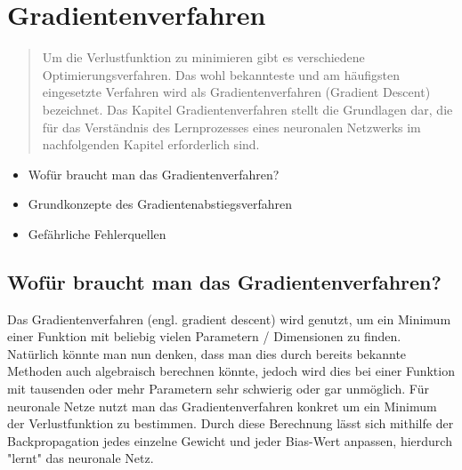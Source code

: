 \newpage
\thispagestyle{empty}
\section{Gradientenverfahren}\label{sec:gradientenverfahren}   
\begin{tcolorbox}[title={Inhalte des \textit{Gradientenverfahren}}]
  \begin{quotation}\noindent
    Um die Verlustfunktion zu minimieren gibt es verschiedene Optimierungsverfahren. Das wohl bekannteste und am häufigsten eingesetzte Verfahren wird als Gradientenverfahren (Gradient Descent) bezeichnet.
    Das Kapitel Gradientenverfahren stellt die Grundlagen dar, die für das Verständnis des Lernprozesses eines neuronalen Netzwerks im nachfolgenden Kapitel erforderlich sind.
  \end{quotation}
  \begin{itemize}
    \item Wofür braucht man das Gradientenverfahren?
    \item Grundkonzepte des Gradientenabstiegsverfahren
    \item Gefährliche Fehlerquellen

  \end{itemize}
\end{tcolorbox}


\subsection{Wofür braucht man das Gradientenverfahren?}\label{subsec:gradientenverfahren:wofuer}
Das Gradientenverfahren (engl. gradient descent) wird genutzt, um ein Minimum einer Funktion mit beliebig vielen Parametern / Dimensionen zu finden.
Natürlich könnte man nun denken, dass man dies durch bereits bekannte Methoden auch algebraisch berechnen könnte, jedoch wird dies 
bei einer Funktion mit tausenden oder mehr Parametern sehr schwierig oder gar unmöglich.
Für neuronale Netze nutzt man das Gradientenverfahren konkret um ein Minimum der Verlustfunktion zu bestimmen. Durch diese Berechnung lässt sich mithilfe der Backpropagation jedes einzelne Gewicht und jeder Bias-Wert anpassen, hierdurch "lernt" das neuronale Netz.

\iffalse
